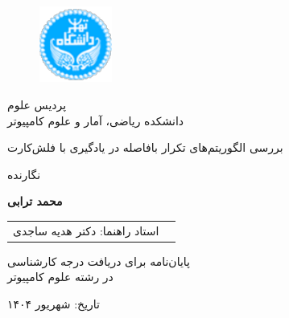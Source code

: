 \documentclass[12pt]{report}
\begin{document}

\begin{figure}
\centering
\includegraphics[height=2.5cm]{UT-Logo.pdf}
\end{figure}

\begin{center}
پردیس علوم
\\
دانشکده ریاضی، آمار و علوم کامپیوتر
\end{center}

\begin{center}
\end{center}

\begin{center}
\huge{بررسی الگوریتم‌های تکرار بافاصله در یادگیری با فلش‌کارت}
\end{center}

\begin{center}
\end{center}

\begin{center}
نگارنده
\end{center}
\begin{center}
\textbf{
محمد ترابی}
\end{center}

\begin{center}
\begin{tabular}{rr}
استاد راهنما: دکتر هدیه ساجدی

\end{tabular}
\end{center}

\vspace{3cm}
\begin{center}
پایان‌نامه برای دریافت درجه کارشناسی
\\
در رشته علوم کامپیوتر
\end{center}

\begin{center}
تاریخ: شهریور ۱۴۰۴
\end{center}

\pagestyle{empty}
\pagenumbering{}

\newpage
\pagestyle{plain}
\setcounter{page}{1}
\end{document}
